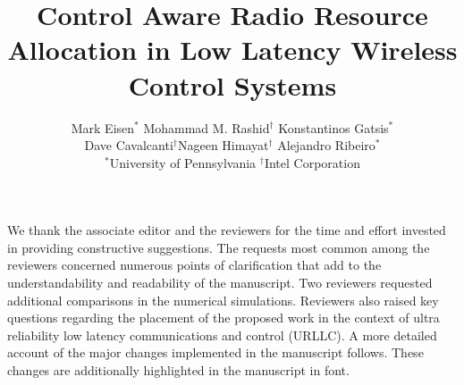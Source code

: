\documentclass[11pt]{article}
\begin{document}
\title{Control Aware Radio Resource Allocation in Low Latency Wireless Control Systems}
\author{Mark Eisen$^*$ \quad Mohammad M. Rashid$^\dagger$ \quad Konstantinos Gatsis$^*$ \\ Dave Cavalcanti$^\dagger$\quad Nageen Himayat$^{\dagger}$ \quad Alejandro Ribeiro$^*$ \\ $^{*}$University of Pennsylvania \quad $^{\dagger}$Intel Corporation} \maketitle                                    %

\editor


We thank the associate editor and the reviewers for the time and effort invested in providing constructive suggestions. The requests most common among the reviewers concerned numerous points of clarification that add to the understandability and readability of the manuscript. Two reviewers requested additional comparisons in the numerical simulations. Reviewers also raised key questions regarding the placement of the proposed work in the context of ultra reliability low latency communications and control (URLLC).  A more detailed account of the major changes implemented in the manuscript follows. These changes are additionally highlighted in the manuscript in  font.
\end{document}

